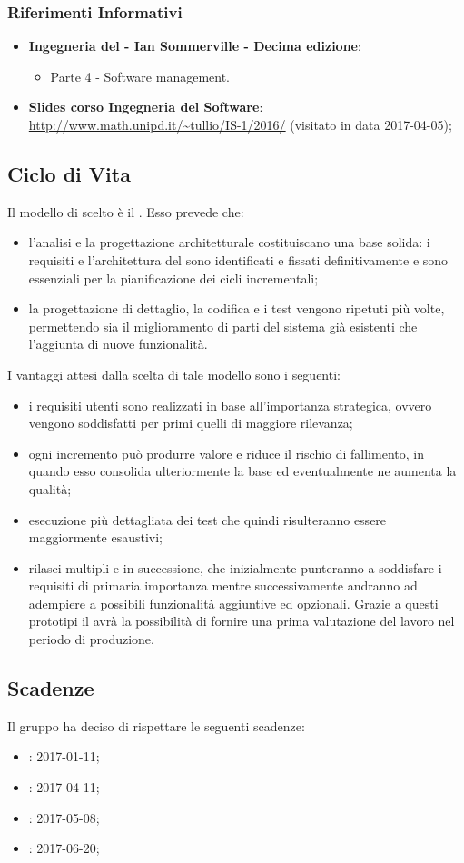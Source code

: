 	    \subsubsection{Riferimenti Informativi}
	    	\begin{itemize}
	    		\item \textbf{Ingegneria del  - Ian Sommerville - Decima edizione}:
	    		\begin{itemize}
	    			\item Parte 4 - Software management.
	    		\end{itemize}
	    		\item \textbf{Slides corso Ingegneria del Software}: \\ \url{http://www.math.unipd.it/~tullio/IS-1/2016/} (visitato in data 2017-04-05);
	    	\end{itemize}
	    
	    \subsection{Ciclo di Vita}
	    Il modello di  scelto è il . Esso prevede che:
	    \begin{itemize}
	    	\item l'analisi e la progettazione architetturale costituiscano una base solida: i requisiti e l'architettura del  sono identificati e fissati definitivamente e sono essenziali per la pianificazione dei cicli incrementali;
	    	\item la progettazione di dettaglio, la codifica e i test vengono ripetuti più volte, permettendo sia il miglioramento di parti del sistema già esistenti che l'aggiunta di nuove funzionalità.
	    \end{itemize}
	    I vantaggi attesi dalla scelta di tale modello sono i seguenti:
	    \begin{itemize}
	    	\item i requisiti utenti sono realizzati in base all'importanza strategica, ovvero vengono soddisfatti per primi quelli di maggiore rilevanza;
	    	\item ogni incremento può produrre valore e riduce il rischio di fallimento, in quando esso consolida ulteriormente la base ed eventualmente ne aumenta la qualità;
	    	\item esecuzione più dettagliata dei test che quindi risulteranno essere maggiormente esaustivi;
	    	\item rilasci multipli e in successione, che inizialmente punteranno a soddisfare i requisiti di primaria importanza mentre successivamente andranno ad adempiere a possibili funzionalità aggiuntive ed opzionali. Grazie a questi prototipi il  avrà la possibilità di fornire una prima valutazione del lavoro nel periodo di produzione.
	    \end{itemize}
	    \subsection{Scadenze}
	    Il gruppo \AUTORE{} ha deciso di rispettare le seguenti scadenze:
	    \begin{itemize}
			\item \RR{}: 2017-01-11;
			\item \RP{}: 2017-04-11;
			\item \RQ{}: 2017-05-08;
			\item \RA{}: 2017-06-20;
	    \end{itemize}